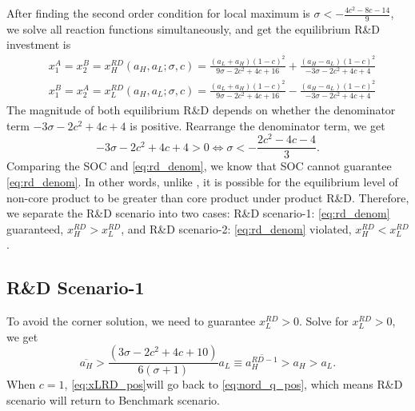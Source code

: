 \documentclass[12pt]{article}
\begin{document}
After finding the second order condition for local maximum is $\sigma < - \frac{4 c^2 - 8 c - 14}{9}$, we solve all reaction functions simultaneously, and get the equilibrium R\&D investment is
\begin{equation}
    \begin{aligned}
        &x_1^A = x_2^B = x_H^{RD} (a_H, a_L ; \sigma, c) = \frac{(a_L + a_H) (1 - c)^2}{9 \sigma - 2 c^2 + 4 c + 16} + \frac{(a_H - a_L)  (1 - c)^2}{- 3 \sigma - 2 c^2 + 4 c + 4}\\
        &x_1^B = x_2^A = x_L^{RD} (a_H, a_L ; \sigma, c) = \frac{(a_L + a_H) (1 - c)^2}{9 \sigma - 2 c^2 + 4 c + 16} - \frac{(a_H - a_L)  (1 - c)^2}{- 3 \sigma - 2 c^2 + 4 c + 4}
    \end{aligned}
\end{equation}
The magnitude of both equilibrium R\&D depends on whether the denominator term $- 3 \sigma - 2 c^2 + 4 c + 4$ is positive.
Rearrange the denominator term, we get
\begin{equation}
    -3 \sigma - 2c^2 + 4c + 4 > 0 \iff \sigma < -\frac{2c^2 - 4c -4}{3}.
    \tag{C2}
    \label{eq:rd_denom}
\end{equation}
Comparing the SOC and \eqref{eq:rd_denom}, we know that SOC cannot guarantee \eqref{eq:rd_denom}.
In other words, unlike \textcite{lin_effects_2013}, it is possible for the equilibrium level of non-core product to be greater than core product under product R\&D.
Therefore, we separate the R\&D scenario into two cases: R\&D scenario-1: \eqref{eq:rd_denom} guaranteed, $x_H^{RD}>x_L^{RD}$, and R\&D scenario-2: \eqref{eq:rd_denom} violated, $x_H^{RD}<x_L^{RD}$.

\subsection{R\&D Scenario-1}
\label{sec:rd_1}

To avoid the corner solution, we need to guarantee $x_L^{RD}>0$.
Solve for $x_L^{RD}>0$, we get
\begin{equation}
  \overline{a_H} > \frac{(3 \sigma - 2 c^2 + 4 c + 10)}{6 (\sigma + 1)} a_L \equiv \overline{a_H^{RD-1}} > a_H > a_L.
    \label{eq:xLRD_pos}
    \tag{C3}
\end{equation}
When $c=1$, \eqref{eq:xLRD_pos}will go back to \eqref{eq:nord_q_pos}, which means R\&D scenario will return to Benchmark scenario.
\end{document}
